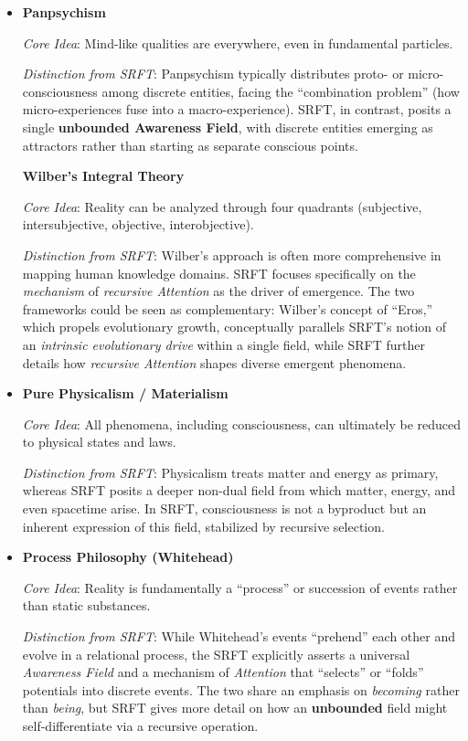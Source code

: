 \documentclass[12pt,a4paper]{article}
\begin{document}
\begin{itemize}
    \item \textbf{Panpsychism}  
    
    \textit{Core Idea}: Mind-like qualities are everywhere, even in fundamental particles.  
    
    \textit{Distinction from SRFT}: Panpsychism typically distributes proto- or micro-consciousness among discrete entities, facing the “combination problem” (how micro-experiences fuse into a macro-experience). SRFT, in contrast, posits a single \textbf{unbounded Awareness Field}, with discrete entities emerging as attractors rather than starting as separate conscious points.

    \textbf{Wilber’s Integral Theory}  
    
    \textit{Core Idea}: Reality can be analyzed through four quadrants (subjective, intersubjective, objective, interobjective).  
    
    \textit{Distinction from SRFT}: Wilber’s approach is often more comprehensive in mapping human knowledge domains. SRFT focuses specifically on the \emph{mechanism} of \emph{recursive Attention} as the driver of emergence. The two frameworks could be seen as complementary: Wilber’s concept of “Eros,” which propels evolutionary growth, conceptually parallels SRFT’s notion of an \emph{intrinsic evolutionary drive} within a single field, while SRFT further details how \emph{recursive Attention} shapes diverse emergent phenomena.

    \item \textbf{Pure Physicalism / Materialism}  
    
    \textit{Core Idea}: All phenomena, including consciousness, can ultimately be reduced to physical states and laws.  
    
    \textit{Distinction from SRFT}: Physicalism treats matter and energy as primary, whereas SRFT posits a deeper non-dual field from which matter, energy, and even spacetime arise. In SRFT, consciousness is not a byproduct but an inherent expression of this field, stabilized by recursive selection.

    \item \textbf{Process Philosophy (Whitehead)}  
    
    \textit{Core Idea}: Reality is fundamentally a “process” or succession of events rather than static substances.  
    
    \textit{Distinction from SRFT}: While Whitehead’s events “prehend” each other and evolve in a relational process, the SRFT explicitly asserts a universal \emph{Awareness Field} and a mechanism of \emph{Attention} that “selects” or “folds” potentials into discrete events. The two share an emphasis on \emph{becoming} rather than \emph{being}, but SRFT gives more detail on how an \textbf{unbounded} field might self-differentiate via a recursive operation.


\end{itemize}
\end{document}
